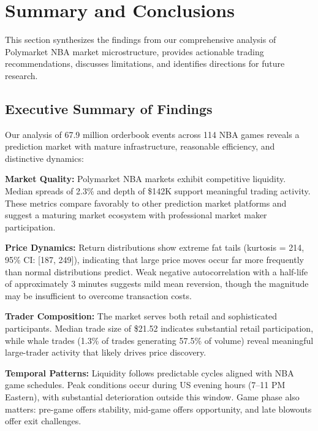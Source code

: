 
\chapter{Summary and Conclusions}
\label{sec:summary}

This section synthesizes the findings from our comprehensive analysis of Polymarket NBA market microstructure, provides actionable trading recommendations, discusses limitations, and identifies directions for future research.

\section{Executive Summary of Findings}

Our analysis of 67.9 million orderbook events across 114 NBA games reveals a prediction market with mature infrastructure, reasonable efficiency, and distinctive dynamics:

\textbf{Market Quality:} Polymarket NBA markets exhibit competitive liquidity. Median spreads of 2.3\% and depth of \$142K support meaningful trading activity. These metrics compare favorably to other prediction market platforms and suggest a maturing market ecosystem with professional market maker participation.

\textbf{Price Dynamics:} Return distributions show extreme fat tails (kurtosis = 214, 95\% CI: [187, 249]), indicating that large price moves occur far more frequently than normal distributions predict. Weak negative autocorrelation with a half-life of approximately 3 minutes suggests mild mean reversion, though the magnitude may be insufficient to overcome transaction costs.

\textbf{Trader Composition:} The market serves both retail and sophisticated participants. Median trade size of \$21.52 indicates substantial retail participation, while whale trades (1.3\% of trades generating 57.5\% of volume) reveal meaningful large-trader activity that likely drives price discovery.

\textbf{Temporal Patterns:} Liquidity follows predictable cycles aligned with NBA game schedules. Peak conditions occur during US evening hours (7--11 PM Eastern), with substantial deterioration outside this window. Game phase also matters: pre-game offers stability, mid-game offers opportunity, and late blowouts offer exit challenges.

